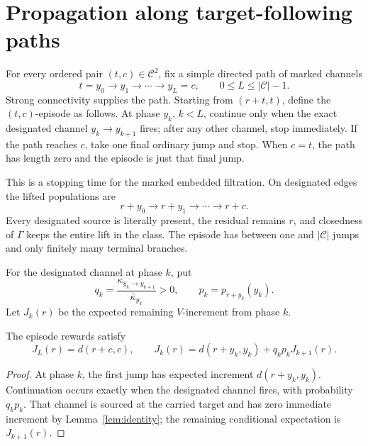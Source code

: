 \section{Propagation along target-following paths}\label{sec:paths}

For every ordered pair \((t,c)\in\mathcal C^2\), fix a simple directed path
of marked channels
\begin{equation}\label{eq:path}
 t=y_0\longrightarrow y_1\longrightarrow\cdots
 \longrightarrow y_L=c,
 \qquad 0\le L\le|\mathcal C|-1.
\end{equation}
Strong connectivity supplies the path.  Starting from \((r+t,t)\), define
the \((t,c)\)-episode as follows.  At phase \(y_k\), \(k<L\), continue only
when the exact designated channel \(y_k\to y_{k+1}\) fires; after any other
channel, stop immediately.  If the path reaches \(c\), take one final
ordinary jump and stop.  When \(c=t\), the path has length zero and the
episode is just that final jump.

This is a stopping time for the marked embedded filtration.  On designated
edges the lifted populations are
\begin{equation}\label{eq:lift}
  r+y_0\longrightarrow r+y_1\longrightarrow\cdots\longrightarrow r+c.
\end{equation}
Every designated source is literally present, the residual remains \(r\),
and closedness of \(\Gamma\) keeps the entire lift in the class.  The episode
has between one and \(|\mathcal C|\) jumps and only finitely many terminal
branches.

For the designated channel at phase \(k\), put
\begin{equation}\label{eq:qk}
 q_k=\frac{\kappa_{y_k\to y_{k+1}}}{\bar\kappa_{y_k}}>0,
 \qquad p_k=p_{r+y_k}(y_k).
\end{equation}
Let \(J_k(r)\) be the expected remaining \(V\)-increment from phase \(k\).

\begin{lemma}\label{lem:recursion}
The episode rewards satisfy
\begin{equation}\label{eq:recursion}
  J_L(r)=d(r+c,c),
  \qquad
  J_k(r)=d(r+y_k,y_k)+q_kp_kJ_{k+1}(r).
\end{equation}
\end{lemma}

\begin{proof}
At phase \(k\), the first jump has expected increment
\(d(r+y_k,y_k)\).  Continuation occurs exactly when the designated channel
fires, with probability \(q_kp_k\).  That channel is sourced at the carried
target and has zero immediate increment by Lemma~\ref{lem:identity}; the
remaining conditional expectation is \(J_{k+1}(r)\).
\end{proof}

